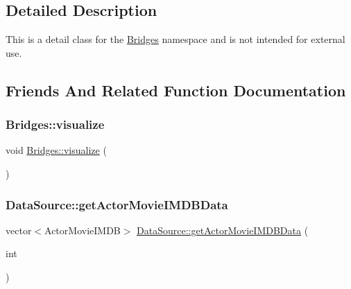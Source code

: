 \subsection{Detailed Description}
This is a detail class for the \mbox{\hyperlink{namespacebridges_1_1_bridges}{Bridges}} namespace and is not intended for external use. 

\subsection{Friends And Related Function Documentation}
\mbox{\label{classbridges_1_1_server_comm_a0a9e3be9faab475909293766dcda4779}} 
\subsubsection{\texorpdfstring{Bridges\+::visualize}{Bridges::visualize}}
{\footnotesize\ttfamily void \mbox{\hyperlink{namespacebridges_1_1_bridges_a2806e395134614cdd6327400b53d28ad}{Bridges\+::visualize}} (\begin{DoxyParamCaption}{ }\end{DoxyParamCaption})\hspace{0.3cm}{\ttfamily [friend]}}

\mbox{\label{classbridges_1_1_server_comm_aeea4f9e05ded118d657ac8ba9e66f22d}} 
\subsubsection{\texorpdfstring{Data\+Source\+::get\+Actor\+Movie\+I\+M\+D\+B\+Data}{DataSource::getActorMovieIMDBData}}
{\footnotesize\ttfamily vector$<$Actor\+Movie\+I\+M\+DB$>$ \mbox{\hyperlink{namespacebridges_1_1_data_source_ac43ccd8f2a325cf2f057a5ee7f0b73f1}{Data\+Source\+::get\+Actor\+Movie\+I\+M\+D\+B\+Data}} (\begin{DoxyParamCaption}\item[{int}]{ }\end{DoxyParamCaption})\hspace{0.3cm}{\ttfamily [friend]}}

